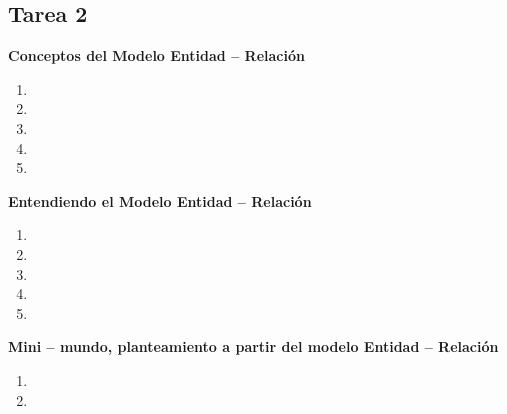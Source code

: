 \documentclass{report}
\begin{document}
	
	
	
	\begin{center}
		\section*{\LARGE{Tarea 2}}
	\end{center}

    \begin{center}
        \LARGE{\textbf{Conceptos del Modelo Entidad – Relación}}\\
    \end{center}
    \normalsize

    \begin{enumerate}[label=\alph*.]
        \item 
        \item 
        \item 
        \item 
        \item 
    \end{enumerate}

    \begin{center}
        \LARGE{\textbf{Entendiendo el Modelo Entidad – Relación}}\\
    \end{center}
    \normalsize

    \begin{enumerate}%
        \item 
        \item 
        \item 
        \item 
        \item 
    \end{enumerate}

    \begin{center}
        \LARGE{\textbf{Mini – mundo, planteamiento a partir del modelo Entidad – Relación}}\\
    \end{center}
    \normalsize

    \begin{enumerate}[label=\alph*.]
        \item 
        \item 
    \end{enumerate}

    \newpage
    
\printbibliography
  
\end{document}
